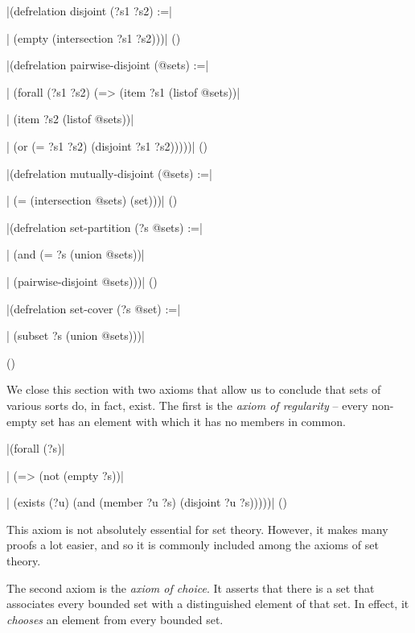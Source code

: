 \medskip
\verbatim|(defrelation disjoint (?s1 ?s2) :=|\par
\verbatim|  (empty (intersection ?s1 ?s2)))|
\hfill(\equation)\par
\medskip

\medskip
\verbatim|(defrelation pairwise-disjoint (@sets) :=|\par
\verbatim|  (forall (?s1 ?s2) (=> (item ?s1 (listof @sets))|\par
\verbatim|                        (item ?s2 (listof @sets))|\par
\verbatim|                        (or (= ?s1 ?s2) (disjoint ?s1 ?s2)))))|
\hfill(\equation)\par

\medskip
\verbatim|(defrelation mutually-disjoint (@sets) :=|\par
\verbatim|  (= (intersection @sets) (set)))|
\hfill(\equation)\par
\medskip

\medskip
\verbatim|(defrelation set-partition (?s @sets) :=|\par
\verbatim|  (and (= ?s (union @sets))|\par
\verbatim|       (pairwise-disjoint @sets)))|
\hfill(\equation)\par
\medskip

\medskip
\verbatim|(defrelation set-cover (?s @set) :=|\par
\verbatim|  (subset ?s (union @sets)))|\par
\hfill(\equation)\par
\medskip

We close this section with two axioms that allow us to conclude that sets of
various sorts do, in fact, exist.  The first is the {\it axiom of regularity}
-- every non-empty set has an element with which it has no members in common.

\medskip
\verbatim|(forall (?s)|\par
\verbatim|  (=> (not (empty ?s))|\par
\verbatim|      (exists (?u) (and (member ?u ?s) (disjoint ?u ?s)))))|
\hfill(\equation)\par
\medskip

This axiom is not absolutely essential for set theory.  However, it makes many
proofs a lot easier, and so it is commonly included among the axioms of set theory.

The second axiom is the {\it axiom of choice}.  It asserts that there is a set that
associates every bounded set with a distinguished element of that set.  In effect, it
{\it chooses} an element from every bounded set.

